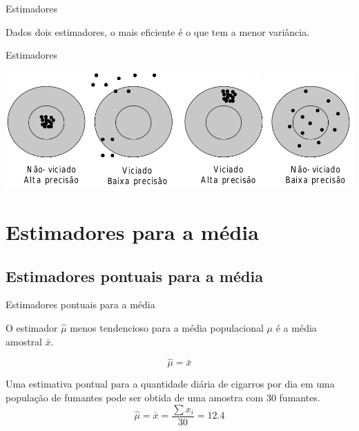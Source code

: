 \documentclass{beamer}
\begin{document}
\begin{frame}{Estimadores}
  \begin{definition}
    Dados dois estimadores, o mais \alert{eficiente} é o que tem a
    menor variância.
  \end{definition}
\end{frame}

\begin{frame}{Estimadores}
  \begin{center}
    \includegraphics[width=\textwidth]{estimadores}
  \end{center}
\end{frame}

\section{Estimadores para a média}



\subsection{Estimadores pontuais para a média}

\begin{frame}{Estimadores pontuais para a média}
  \begin{block}{}
    O estimador $\hat{\mu}$ menos tendencioso para a média
    populacional $\mu$ é a média amostral $\bar{x}$.
  \end{block}
  \begin{displaymath}
    \hat{\mu} = \bar{x}
  \end{displaymath}
\end{frame}

\begin{frame}
  \begin{example}
    Uma estimativa pontual para a quantidade diária de cigarros por
    dia em uma população de fumantes pode ser obtida de uma amostra
    com 30 fumantes.
    \begin{displaymath}
      \hat{\mu} = \bar{x} = \frac{\sum x_i}{30} = 12.4
    \end{displaymath}
  \end{example}
\end{frame}
\end{document}
